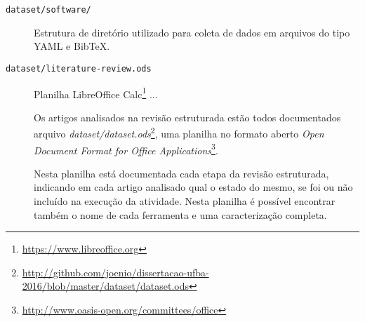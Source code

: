 \begin{description}
  \item [\texttt{dataset/software/}] Estrutura de diretório utilizado para coleta de dados em arquivos do tipo YAML e BibTeX.
  \item [\texttt{dataset/literature-review.ods}] Planilha LibreOffice Calc\footnote{\url{https://www.libreoffice.org}} ...

Os artigos analisados na revisão estruturada estão todos documentados arquivo
{\it
dataset/dataset.ods}\footnote{\url{http://github.com/joenio/dissertacao-ufba-2016/blob/master/dataset/dataset.ods}},
uma planilha no formato aberto {\it Open Document Format for Office
Applications}\footnote{\url{http://www.oasis-open.org/committees/office}}.




Nesta planilha está documentada cada etapa da revisão estruturada, indicando em
cada artigo analisado qual o estado do mesmo, se foi ou não incluído na
execução da atividade.  Nesta planilha é possível encontrar também o nome de
cada ferramenta e uma caracterização completa.








\end{description}

